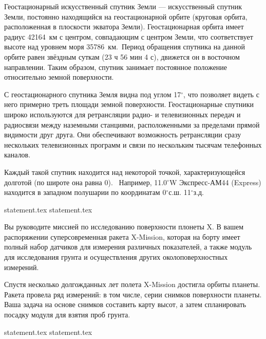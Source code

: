 Геостационарный искусственный спутник Земли — искусственный спутник Земли, постоянно находящийся на геостационарной орбите (круговая орбита, расположенная в плоскости экватора Земли). Геостационарная орбита имеет радиус 42164~км с центром, совпадающим с центром Земли, что соответствует высоте над уровнем моря 35786~км. Период обращения спутника на данной орбите равен звёздным суткам (23 ч 56 мин 4 с), движется он в восточном направлении. Таким образом, спутник занимает постоянное положение относительно земной поверхности.

С геостационарного спутника Земля видна под углом 17$^\circ$, что позволяет видеть с него примерно треть площади земной поверхности. Геостационарные спутники широко используются для ретрансляции радио- и телевизионных передач и радиосвязи между наземными станциями, расположенными за пределами прямой видимости друг друга. Они обеспечивают возможность ретрансляции сразу нескольких телевизионных программ и связи по нескольким тысячам телефонных каналов.

Каждый такой спутник находится над некоторой точкой, характеризующейся долготой (по широте она равна 0). 
Например, 11.0$^\circ$W Экспресс-АМ44 (Express) находится в западном полушарии по координатам 0$^\circ$с.ш. 11$^\circ$з.д.

{statement.tex}
{statement.tex}

Вы руководите миссией по исследованию поверхности плонеты X. В вашем распоряжении суперсовременная ракета X-Mission, которая на борту имеет полный набор датчиков для измерения различных показателей, а также модуль для исследования грунта и осуществления других околоповерхностных измерений.

Спустя несколько долгожданных лет полета X-Mission достигла орбиты планеты. Ракета провела ряд измерений: в том числе, серии снимков поверхности планеты. Ваша задача на основе снимков составить карту высот, а затем спланировать посадку модуля для взятия проб грунта. 

{statement.tex}
{statement.tex}